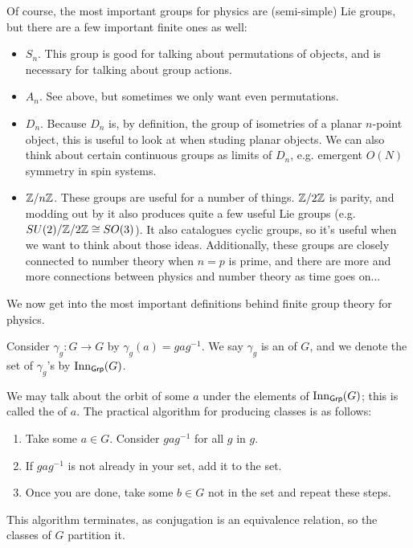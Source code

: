 \documentclass[11pt]{article}
\begin{document}
\begin{eexample}
    Of course, the most important groups for physics are (semi-simple)
    Lie groups, but there are a few important finite ones as well:
    \begin{itemize}
        \item $S_n$. This group is good for talking about permutations
        of objects, and is necessary for talking about group actions.
        \item $A_n$. See above, but sometimes we only want even permutations.
        \item $D_n$. Because $D_n$ is, by definition, the group of isometries
        of a planar $n$-point object, this is useful to look at when studing
        planar objects. We can also think about certain continuous groups
        as limits of $D_n$, e.g. emergent $O(N)$ symmetry in spin systems.
        \item $\mathbb{Z}/n\mathbb{Z}$. These groups are useful for a number of things.
        $\mathbb{Z}/2\mathbb{Z}$ is parity, and modding out by it also produces quite
        a few useful Lie groups (e.g. $SU(2)/\mathbb{Z}/2\mathbb{Z} \cong SO(3)$). It also
        catalogues cyclic groups, so it's useful when we want to think about
        those ideas. Additionally, these groups are closely connected to number
        theory when $n = p$ is prime, and there are more and more connections
        between physics and number theory as time goes on$\ldots$
    \end{itemize}
\end{eexample}

We now get into the most important definitions behind finite
group theory for physics.

\begin{definition}
    Consider $\gamma_g \colon G \to G$ by $\gamma_g(a) = g a g^{-1}$.
    We say $\gamma_g$ is an  of $G$, and we
    denote the set of $\gamma_g$'s by $\operatorname{Inn}_{\text{\text{\sffamily{Grp}}}}(G)$.
\end{definition}

We may talk about the orbit of some $a$ under the elements of 
$\operatorname{Inn}_{\text{\text{\sffamily{Grp}}}}(G)$; this is called the
 of $a$. The practical algorithm for producing classes
is as follows:
\begin{enumerate}
    \item Take some $a \in G$. Consider $g a g^{-1}$ for all $g$
    in $g$.
    \item If $g a g^{-1}$ is not already in your set, add it to the
    set.
    \item Once you are done, take some $b \in G$ not in the set
    and repeat these steps.
\end{enumerate}
This algorithm terminates, as conjugation is an equivalence relation,
so the classes of $G$ partition it.
\end{document}
